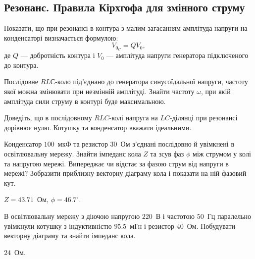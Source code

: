 \subsection*{Резонанс. Правила Кірхгофа для змінного струму}

\begin{problem}%
Показати, що при резонансі в контура з малим загасанням амплітуда
напруги на конденсаторі визначається формулою:
\begin{equation*}
	V_{0_C} = QV_0,
\end{equation*}
де $Q$ --- добротність контура і $V_0$ --- амплітуда напруги генератора підключеного до контура.
\end{problem}

\begin{problem}%
Послідовне $RLС$-коло під'єднано до генератора синусоїдальної напруги, частоту якої можна змінювати при незмінній амплітуді. Знайти частоту $\omega$, при якій амплітуда сили струму в контурі буде максимальною.
\end{problem}

\begin{problem}%
Доведіть, що в послідовному $RLC$-колі напруга на $LC$-ділянці при резонансі дорівнює нулю. Котушку та конденсатор вважати ідеальними.
\end{problem}

\begin{problem}%
Конденсатор $100$~мкФ та резистор $30$~Ом з'єднані послідовно й увімкнені в освітлювальну мережу. Знайти імпеданс кола $Z$ та зсув фаз $\phi$ між струмом у колі та напругою мережі. Випереджає чи відстає за фазою струм від напруги в мережі? Зобразити приблизну векторну діаграму кола і показати на ній фазовий кут.
\begin{solution}
	$Z = 43.71$~Ом, $\phi = 46.7^\circ$.
\end{solution}
\end{problem}

\begin{problem}%
В освітлювальну мережу з діючою напругою $220$~В і частотою $50$~Гц
паралельно увімкнули котушку з індуктивністю $95.5$~мГн і резистор $40$~Ом. Побудувати векторну діаграму та знайти імпеданс кола.
\begin{solution}
	$24$~Ом.
\end{solution}
\end{problem}

